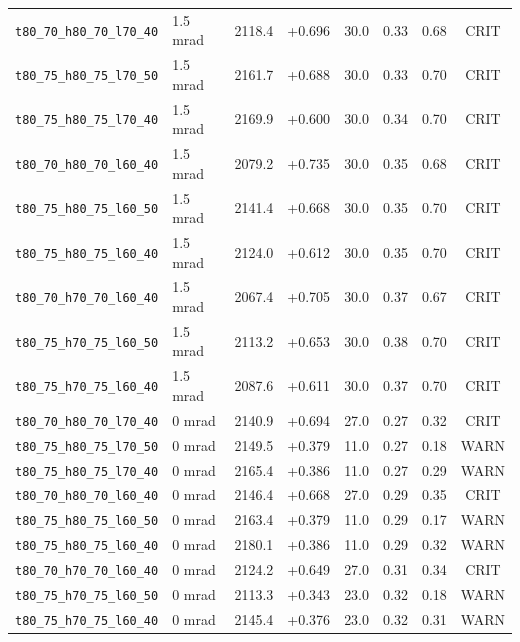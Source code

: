 \documentclass[11pt]{article}
\begin{document}
\begin{longtable}{l l r r r r r c}
\texttt{t80\_70\_h80\_70\_l70\_40} & 1.5 mrad & 2118.4 & +0.696 & 30.0 & 0.33 & 0.68 & \textsc{CRIT} \\
\texttt{t80\_75\_h80\_75\_l70\_50} & 1.5 mrad & 2161.7 & +0.688 & 30.0 & 0.33 & 0.70 & \textsc{CRIT} \\
\texttt{t80\_75\_h80\_75\_l70\_40} & 1.5 mrad & 2169.9 & +0.600 & 30.0 & 0.34 & 0.70 & \textsc{CRIT} \\
\texttt{t80\_70\_h80\_70\_l60\_40} & 1.5 mrad & 2079.2 & +0.735 & 30.0 & 0.35 & 0.68 & \textsc{CRIT} \\
\texttt{t80\_75\_h80\_75\_l60\_50} & 1.5 mrad & 2141.4 & +0.668 & 30.0 & 0.35 & 0.70 & \textsc{CRIT} \\
\texttt{t80\_75\_h80\_75\_l60\_40} & 1.5 mrad & 2124.0 & +0.612 & 30.0 & 0.35 & 0.70 & \textsc{CRIT} \\
\texttt{t80\_70\_h70\_70\_l60\_40} & 1.5 mrad & 2067.4 & +0.705 & 30.0 & 0.37 & 0.67 & \textsc{CRIT} \\
\texttt{t80\_75\_h70\_75\_l60\_50} & 1.5 mrad & 2113.2 & +0.653 & 30.0 & 0.38 & 0.70 & \textsc{CRIT} \\
\texttt{t80\_75\_h70\_75\_l60\_40} & 1.5 mrad & 2087.6 & +0.611 & 30.0 & 0.37 & 0.70 & \textsc{CRIT} \\
\midrule
\texttt{t80\_70\_h80\_70\_l70\_40} & 0 mrad   & 2140.9 & +0.694 & 27.0 & 0.27 & 0.32 & \textsc{CRIT} \\
\texttt{t80\_75\_h80\_75\_l70\_50} & 0 mrad   & 2149.5 & +0.379 & 11.0 & 0.27 & 0.18 & \textsc{WARN} \\
\texttt{t80\_75\_h80\_75\_l70\_40} & 0 mrad   & 2165.4 & +0.386 & 11.0 & 0.27 & 0.29 & \textsc{WARN} \\
\texttt{t80\_70\_h80\_70\_l60\_40} & 0 mrad   & 2146.4 & +0.668 & 27.0 & 0.29 & 0.35 & \textsc{CRIT} \\
\texttt{t80\_75\_h80\_75\_l60\_50} & 0 mrad   & 2163.4 & +0.379 & 11.0 & 0.29 & 0.17 & \textsc{WARN} \\
\texttt{t80\_75\_h80\_75\_l60\_40} & 0 mrad   & 2180.1 & +0.386 & 11.0 & 0.29 & 0.32 & \textsc{WARN} \\
\texttt{t80\_70\_h70\_70\_l60\_40} & 0 mrad   & 2124.2 & +0.649 & 27.0 & 0.31 & 0.34 & \textsc{CRIT} \\
\texttt{t80\_75\_h70\_75\_l60\_50} & 0 mrad   & 2113.3 & +0.343 & 23.0 & 0.32 & 0.18 & \textsc{WARN} \\
\texttt{t80\_75\_h70\_75\_l60\_40} & 0 mrad   & 2145.4 & +0.376 & 23.0 & 0.32 & 0.31 & \textsc{WARN} \\
\end{longtable}
\end{document}
